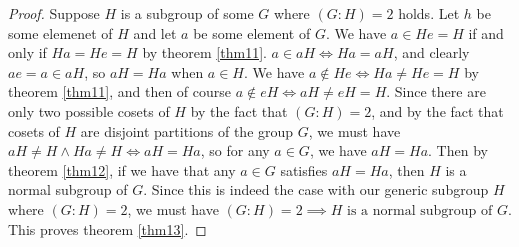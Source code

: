 \documentclass[12pt]{article}
\begin{document}
\begin{proof}
	Suppose $H$ is a subgroup of some $G$
	where $(G:H) = 2$ holds.
	Let $h$ be some elemenet of $H$
	and let $a$ be some element of $G$.
	We have $a \in He = H$
	if and only if
	$Ha = He = H$
	by theorem \ref{thm11}.
	$a \in aH \iff Ha = aH$,
	and clearly $ae = a \in aH$,
	so $aH = Ha$ when $a \in H$.
	We have $a \not\in He \iff Ha \neq He = H$
	by theorem \ref{thm11},
	and then of course $a \not\in eH \iff aH \neq eH = H$.
	Since there are only two possible cosets of $H$
	by the fact that $(G:H) = 2$,
	and by the fact that cosets of $H$
	are disjoint partitions of the group $G$,
	we must have $aH \neq H \land Ha \neq H \iff aH = Ha$,
	so for any $a \in G$, we have $aH = Ha$.
	Then by theorem \ref{thm12},
	if we have that any $a \in G$
	satisfies $aH = Ha$,
	then $H$ is a normal subgroup of $G$.
	Since this is indeed the case with our generic
	subgroup  $H$ where $(G:H) = 2$,
	we must have $(G:H) = 2 \implies H \textrm{ is a normal subgroup of } G$.
	This proves theorem \ref{thm13}.
\end{proof}
\end{document}
